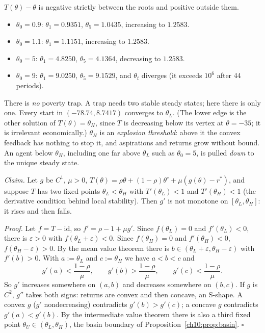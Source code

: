 \documentclass[../solutions_manual.tex]{subfiles}
\begin{document}
 $T(\theta) - \theta$ is negative strictly between the roots and positive outside them.
\begin{itemize}
\item $\theta_0 = 0.9$: $\theta_1 = 0.9351$, $\theta_5 = 1.0435$, increasing to $1.2583$.
\item $\theta_0 = 1.1$: $\theta_1 = 1.1151$, increasing to $1.2583$.
\item $\theta_0 = 5$: $\theta_1 = 4.8250$, $\theta_5 = 4.1364$, decreasing to $1.2583$.
\item $\theta_0 = 9$: $\theta_1 = 9.0250$, $\theta_5 = 9.1529$, and $\theta_t$ diverges (it exceeds $10^6$ after 44 periods).
\end{itemize}
There is \emph{no} poverty trap. A trap needs two stable steady states; here there is only one. Every start in $(-78.74, 8.7417)$ converges to $\theta_L$. (The lower edge is the other solution of $T(\theta) = \theta_H$, since $T$ is decreasing below its vertex at $\theta = -35$; it is irrelevant economically.) $\theta_H$ is an \emph{explosion threshold}: above it the convex feedback has nothing to stop it, and aspirations and returns grow without bound. An agent below $\theta_H$, including one far above $\theta_L$ such as $\theta_0 = 5$, is pulled \emph{down} to the unique steady state.

 \textit{Claim.} Let $g$ be $C^1$, $\mu > 0$, $T(\theta) = \rho\theta + (1-\rho)\theta^{\circ} + \mu(g(\theta) - r^*)$, and suppose $T$ has two fixed points $\theta_L < \theta_H$ with $T'(\theta_L) < 1$ and $T'(\theta_H) < 1$ (the derivative condition behind local stability). Then $g'$ is not monotone on $[\theta_L, \theta_H]$: it rises and then falls.

\textit{Proof.} Let $f = T - \mathrm{id}$, so $f' = \rho - 1 + \mu g'$. Since $f(\theta_L) = 0$ and $f'(\theta_L) < 0$, there is $\varepsilon > 0$ with $f(\theta_L + \varepsilon) < 0$. Since $f(\theta_H) = 0$ and $f'(\theta_H) < 0$, $f(\theta_H - \varepsilon) > 0$. By the mean value theorem there is $b \in (\theta_L + \varepsilon, \theta_H - \varepsilon)$ with $f'(b) > 0$. With $a := \theta_L$ and $c := \theta_H$ we have $a < b < c$ and
\[
g'(a) < \frac{1-\rho}{\mu}, \qquad g'(b) > \frac{1-\rho}{\mu}, \qquad g'(c) < \frac{1-\rho}{\mu}.
\]
So $g'$ increases somewhere on $(a, b)$ and decreases somewhere on $(b, c)$. If $g$ is $C^2$, $g''$ takes both signs: returns are convex and then concave, an S-shape. A convex $g$ ($g'$ nondecreasing) contradicts $g'(b) > g'(c)$; a concave $g$ contradicts $g'(a) < g'(b)$. By the intermediate value theorem there is also a third fixed point $\theta_U \in (\theta_L, \theta_H)$, the basin boundary of Proposition~\ref{ch10:prop:basin}. $\square$
\end{document}
